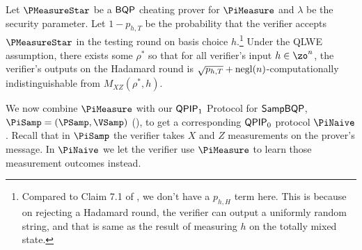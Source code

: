 \begin{lemma}
	\label{lem:urmila-binding}
	Let $\PMeasureStar$ be a $\operatorname{\mathsf{BQP}}$ cheating  prover for $\PiMeasure$ and $\lambda$ be the security parameter. Let $1-p_{h,T}$ be the  probability that the verifier accepts $\PMeasureStar$ in the testing round on basis choice $h$.\footnote{Compared to Claim 7.1 of \cite{FOCS:Mahadev18a}, we don't have a $p_{h,H}$ term here. This is because on rejecting a Hadamard round, the verifier can output a uniformly random string, and that is same as the result of measuring $h$ on the totally mixed state.} Under the QLWE assumption, there exists some $\rho^*$ so that for all verifier's input $h \in \zo^n$, the verifier's outputs on the Hadamard round is $\sqrt{p_{h,T}}+\operatorname{negl}(n)$-computationally indistinguishable from $M_{XZ}(\rho^*, h)$.
\end{lemma}

We now combine $\PiMeasure$ with our $\operatorname{\mathsf{QPIP}}_1$ Protocol for $\operatorname{\mathsf{SampBQP}}$, $\PiSamp=(\PSamp, \VSamp)$ (), to get a corresponding $\operatorname{\mathsf{QPIP}}_0$ protocol $\PiNaive$.
Recall that in $\PiSamp$ the verifier takes $X$ and $Z$ measurements on the prover's message.
In $\PiNaive$ we let the verifier use $\PiMeasure$ to learn those measurement outcomes instead. 

